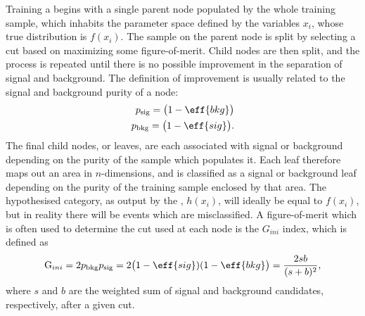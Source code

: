Training a \DT begins with a single parent node populated by the whole
training sample, which inhabits the parameter space defined by the
variables $x_i$, whose true distribution is $f(x_i)$.
The sample on the parent node is split by selecting a cut based on maximizing some figure-of-merit.
Child nodes are then split, and the process is repeated
until there is no possible improvement in the separation of signal and background.
The definition of improvement is usually related to the signal and background purity of a node:
\begin{align}
  p_\mathrm{sig} = \big(1-\eff{bkg}\big)\nonumber\\
  p_\mathrm{bkg} = \big(1-\eff{sig}\big).
\end{align}
The final child nodes, or leaves, are each associated with signal or background depending on the
purity of the sample which populates it.
Each leaf therefore maps out an area in $n$-dimensions, and is classified as a signal or background leaf
depending on the purity of the training sample enclosed by that area.
The hypothesised category, as output by the \DT, $h(x_i)$, will ideally be equal to $f(x_i)$, but in reality there will be
events which are misclassified.
A figure-of-merit which is often used to determine the cut used at each node is the $G_{ini}$
index, which is defined as
\begin{equation}
  \mathrm{G}_{ini} = 2p_\mathrm{bkg}p_\mathrm{sig}
  = 2\big(1-\eff{sig})(1-\eff{bkg}\big)
  = \frac{2sb}{(s+b)^2},
\end{equation}
where $s$ and $b$ are the weighted sum of signal and background candidates, respectively, after a
given cut.

